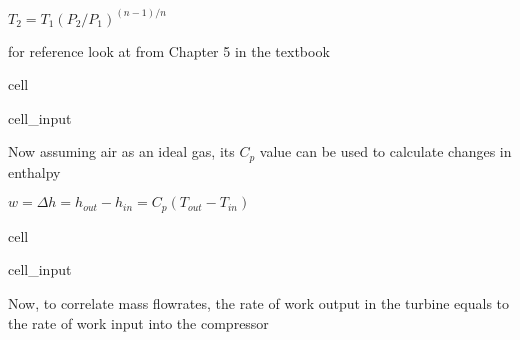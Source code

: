 \documentclass[letterpaper,10pt,english]{jupyterBook}
\begin{document}
\sphinxAtStartPar
\(T_2=T_1(P_2/P_1)^{(n-1)/n}\)

\sphinxAtStartPar
for reference look at  from Chapter 5 in the textbook

\begin{sphinxuseclass}{cell}\begin{sphinxVerbatimInput}

\begin{sphinxuseclass}{cell_input}
\begin{sphinxVerbatim}[commandchars=\\\{\}]
   
     
   
   
     
\end{sphinxVerbatim}

\end{sphinxuseclass}\end{sphinxVerbatimInput}

\end{sphinxuseclass}
\sphinxAtStartPar
Now assuming air as an ideal gas, its \(C_p\) value can be used to calculate changes in enthalpy

\sphinxAtStartPar
\(w=\Delta h=h_{out}-h_{in}=C_p(T_{out}-T_{in})\)

\begin{sphinxuseclass}{cell}\begin{sphinxVerbatimInput}

\begin{sphinxuseclass}{cell_input}
\begin{sphinxVerbatim}[commandchars=\\\{\}]
   
       
\end{sphinxVerbatim}

\end{sphinxuseclass}\end{sphinxVerbatimInput}

\end{sphinxuseclass}
\sphinxAtStartPar
Now, to correlate mass flow\sphinxhyphen{}rates, the rate of work output in the turbine equals to the rate of work input into the compressor
\end{document}
